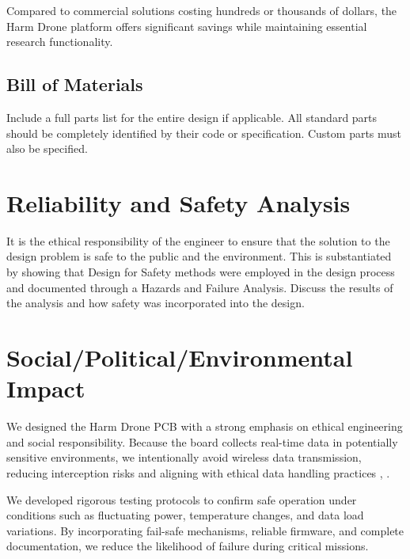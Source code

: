 \documentclass[12pt]{article}
\begin{document}
\par Compared to commercial solutions costing hundreds or thousands of dollars, the Harm Drone platform offers significant savings while maintaining essential research functionality.

\subsection{Bill of Materials}
Include a full parts list for the entire design if applicable. All standard parts should be completely identified by their code or specification. Custom parts must also be specified.
\section{Reliability and Safety Analysis}
It is the ethical responsibility of the engineer to ensure that the solution to the design problem is safe to the public and the environment. This is substantiated by showing that Design for Safety methods were employed in the design process and documented through a Hazards and Failure Analysis. Discuss the results of the analysis and how safety was incorporated into the design.

\section{Social/Political/Environmental Impact}

\par We designed the Harm Drone PCB with a strong emphasis on ethical engineering and social responsibility. Because the board collects real-time data in potentially sensitive environments, we intentionally avoid wireless data transmission, reducing interception risks and aligning with ethical data handling practices \cite{ieee_ethics}, \cite{ccpa}.

\par We developed rigorous testing protocols to confirm safe operation under conditions such as fluctuating power, temperature changes, and data load variations. By incorporating fail-safe mechanisms, reliable firmware, and complete documentation, we reduce the likelihood of failure during critical missions.
\end{document}
